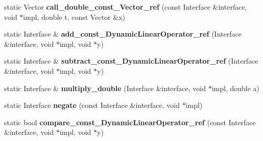 \begin{DoxyCompactItemize}
\item 
\hypertarget{structSpacy_1_1DynamicLinearOperatorDetail_1_1execution__wrapper_abbd4bfee3f33b9930d3f8dfb55d3ead2}{static \-Vector {\bfseries call\-\_\-double\-\_\-const\-\_\-\-Vector\-\_\-ref} (const \-Interface \&interface, void $\ast$impl, double t, const \-Vector \&x)}\label{structSpacy_1_1DynamicLinearOperatorDetail_1_1execution__wrapper_abbd4bfee3f33b9930d3f8dfb55d3ead2}

\item 
\hypertarget{structSpacy_1_1DynamicLinearOperatorDetail_1_1execution__wrapper_a896a9026b9dd6af632e3ea063d97ffd8}{static \-Interface \& {\bfseries add\-\_\-const\-\_\-\-Dynamic\-Linear\-Operator\-\_\-ref} (\-Interface \&interface, void $\ast$impl, void $\ast$y)}\label{structSpacy_1_1DynamicLinearOperatorDetail_1_1execution__wrapper_a896a9026b9dd6af632e3ea063d97ffd8}

\item 
\hypertarget{structSpacy_1_1DynamicLinearOperatorDetail_1_1execution__wrapper_a967c3be86e6b9e4cb1789af95af86750}{static \-Interface \& {\bfseries subtract\-\_\-const\-\_\-\-Dynamic\-Linear\-Operator\-\_\-ref} (\-Interface \&interface, void $\ast$impl, void $\ast$y)}\label{structSpacy_1_1DynamicLinearOperatorDetail_1_1execution__wrapper_a967c3be86e6b9e4cb1789af95af86750}

\item 
\hypertarget{structSpacy_1_1DynamicLinearOperatorDetail_1_1execution__wrapper_a5b43aecf211b7fb250e020715faf1ee9}{static \-Interface \& {\bfseries multiply\-\_\-double} (\-Interface \&interface, void $\ast$impl, double a)}\label{structSpacy_1_1DynamicLinearOperatorDetail_1_1execution__wrapper_a5b43aecf211b7fb250e020715faf1ee9}

\item 
\hypertarget{structSpacy_1_1DynamicLinearOperatorDetail_1_1execution__wrapper_a9ba1cf0eb915fef2a61fddf870bfc0a8}{static \-Interface {\bfseries negate} (const \-Interface \&interface, void $\ast$impl)}\label{structSpacy_1_1DynamicLinearOperatorDetail_1_1execution__wrapper_a9ba1cf0eb915fef2a61fddf870bfc0a8}

\item 
\hypertarget{structSpacy_1_1DynamicLinearOperatorDetail_1_1execution__wrapper_add75661915b9aede3aee4cb3c6c6eb02}{static bool {\bfseries compare\-\_\-const\-\_\-\-Dynamic\-Linear\-Operator\-\_\-ref} (const \-Interface \&interface, void $\ast$impl, void $\ast$y)}\label{structSpacy_1_1DynamicLinearOperatorDetail_1_1execution__wrapper_add75661915b9aede3aee4cb3c6c6eb02}


\end{DoxyCompactItemize}

